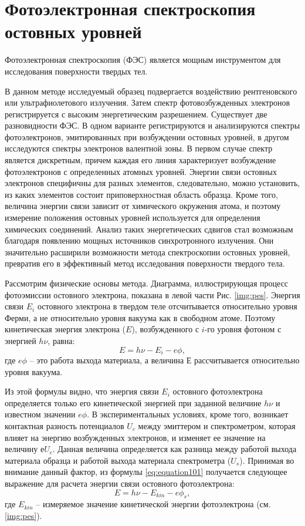 \section{Фотоэлектронная спектроскопия остовных уровней}
Фотоэлектронная спектроскопия (ФЭС) является мощным инструментом для исследования поверхности твердых тел.

В данном методе исследуемый образец подвергается воздействию рентгеновского или ультрафиолетового излучения. Затем спектр фотовозбужденных электронов регистрируется с высоким энергетическим разрешением. Существует две разновидности ФЭС. В одном варианте регистрируются и анализируются спектры фотоэлектронов, эмитированных при возбуждении остовных уровней, в другом исследуются спектры электронов валентной зоны. В первом случае спектр является дискретным, причем каждая его линия характеризует возбуждение фотоэлектронов с определенных атомных уровней. Энергии связи остовных электронов специфичны для разных элементов, следовательно, можно установить, из каких элементов состоит приповерхностная область образца. Кроме того, величина энергии связи зависит от химического окружения атома, и поэтому измерение положения остовных уровней используется для определения химических соединений. Анализ таких энергетических сдвигов стал возможным благодаря появлению мощных источников синхротронного излучения. Они значительно расширили возможности метода спектроскопии остовных уровней, превратив его в эффективный метод исследования поверхности твердого тела. 

Рассмотрим физические основы метода. Диаграмма, иллюстрирующая процесс фотоэмиссии остовного электрона, показана в левой части Рис. \ref{img:pes}. Энергия связи $E_i$ остовного электрона в твердом теле отсчитывается относительно уровня Ферми, а не относительно уровня вакуума как в свободном атоме. Поэтому кинетическая энергия электрона ($E$), возбужденного с $i$-го уровня фотоном с энергией $h\nu$, равна: 
 	\begin{equation}
  \label{eq:equation101}
E=h\nu-E_i -e\phi,
\end{equation}
где $e\phi$ – это работа выхода материала, а величина $Е$ рассчитывается относительно уровня вакуума.

Из этой формулы видно, что энергия связи $E_i$ остовного фотоэлектрона определяется только его кинетической энергией при заданной величине $h\nu$ и известном значении $e\phi$. В экспериментальных условиях, кроме того, возникает контактная разность потенциалов $U_c$ между эмиттером и спектрометром, которая влияет на энергию возбужденных электронов, и изменяет ее значение на величину $еU_c$. Данная величина определяется как разница между работой выхода материала образца и работой выхода материала спектрометра ($U_s$). Принимая во внимание данный фактор, из формулы \ref{eq:equation101} получается следующее выражение для расчета энергии связи остовного фотоэлектрона:
 	\begin{equation}
  \label{eq:equation102}
E=h\nu-E_{kin} -e\phi_s,
\end{equation}
где $E_{kin}$ – измеряемое значение кинетической энергии фотоэлектрона (см. \ref{img:pes}).

